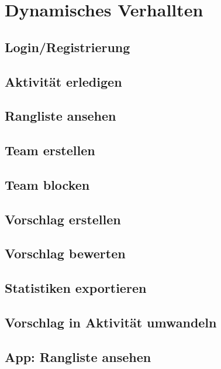 \section{Dynamisches Verhallten}
\subsection{Login/Registrierung}
\subsection{Aktivität erledigen}
\subsection{Rangliste ansehen}
\subsection{Team erstellen}
\subsection{Team blocken}
\subsection{Vorschlag erstellen}
\subsection{Vorschlag bewerten}
\subsection{Statistiken exportieren}
\subsection{Vorschlag in Aktivität umwandeln}
\subsection{App: Rangliste ansehen}
